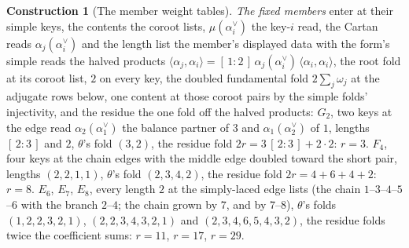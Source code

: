 \documentclass[11pt]{article}
\theoremstyle{definition}
\newtheorem{construction}{Construction}
\begin{document}
\begin{construction}[The member weight tables]
\emph{The fixed members} enter at their simple keys, the contents
the coroot lists, $\mu(\alpha_i^\vee)$ the key-$i$ read, the
Cartan reads $\alpha_j(\alpha_i^\vee)$ and the length list the
member's displayed data with the form's simple reads the halved
products
$\langle\alpha_j,\alpha_i\rangle=[\,1:2\,]\,\alpha_j(\alpha_i^\vee)
\,\langle\alpha_i,\alpha_i\rangle$, the root fold at its coroot
list, $2$ on every key, the doubled fundamental fold
$2\sum_j\omega_j$ at the adjugate rows below, one content at
those coroot pairs by the simple folds' injectivity, and the
residue the one fold off the halved products:
$G_2$, two keys at the edge read $\alpha_2(\alpha_1^\vee)$ the
balance partner of $3$ and $\alpha_1(\alpha_2^\vee)$ of $1$,
lengths $[\,2:3\,]$ and $2$, $\theta$'s fold $(3,2)$, the residue
fold $2r=3\,[\,2:3\,]+2\cdot2$: $r=3$. $F_4$, four keys at the
chain edges with the middle edge doubled toward the short pair,
lengths $(2,2,1,1)$, $\theta$'s fold $(2,3,4,2)$, the residue
fold $2r=4+6+4+2$: $r=8$. $E_6$, $E_7$, $E_8$, every length $2$
at the simply-laced edge lists (the chain $1$--$3$--$4$--$5$--$6$
with the branch $2$--$4$; the chain grown by $7$, and by $7$--$8$),
$\theta$'s folds $(1,2,2,3,2,1)$, $(2,2,3,4,3,2,1)$ and
$(2,3,4,6,5,4,3,2)$, the residue folds twice the coefficient
sums: $r=11$, $r=17$, $r=29$.


\end{construction}
\end{document}
